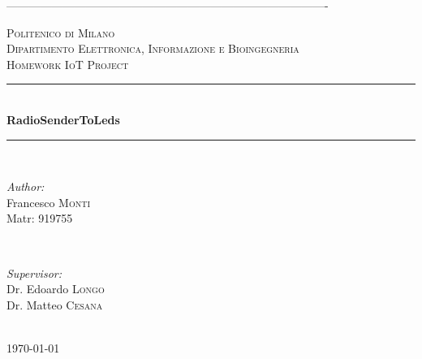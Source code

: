 \documentclass[12pt]{article}
\begin{document}
\begin{titlepage}

\newcommand{\HRule}{\rule{\linewidth}{0.5mm}} 

\center
-------------------------------------------------------------------------------------

\textsc{\LARGE Politenico di Milano}\\[1cm]
\textsc{\Large Dipartimento Elettronica, Informazione e Bioingegneria}\\[0.5cm] 
\textsc{\large Homework IoT Project}\\[0.5cm] 


\HRule \\[0.4cm]
{ \huge \bfseries RadioSenderToLeds}\\[0.4cm]
\HRule \\[1.5cm]
 

\begin{minipage}{0.4\textwidth}
	\begin{flushleft} \large
		\emph{Author:}\\
		Francesco \textsc{Monti}\\
		Matr: 919755 
	\end{flushleft}
\end{minipage}
~
\begin{minipage}{0.4\textwidth}
	\begin{flushright} \large
		\emph{Supervisor:} \\
		Dr. Edoardo \textsc{Longo}\\
		Dr. Matteo \textsc{Cesana}
	\end{flushright}
\end{minipage}\\[1.5cm]



{\large \today}\\[2cm] 


\end{titlepage}
\end{document}
